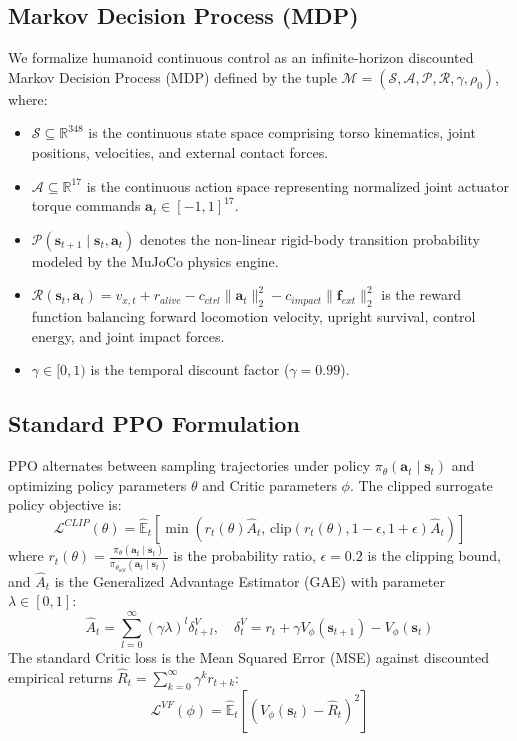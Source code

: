 \documentclass{article}
\begin{document}
\subsection{Markov Decision Process (MDP)}
We formalize humanoid continuous control as an infinite-horizon discounted Markov Decision Process (MDP) defined by the tuple $\mathcal{M} = (\mathcal{S}, \mathcal{A}, \mathcal{P}, \mathcal{R}, \gamma, \rho_0)$, where:
\begin{itemize}
    \item $\mathcal{S} \subseteq \mathbb{R}^{348}$ is the continuous state space comprising torso kinematics, joint positions, velocities, and external contact forces.
    \item $\mathcal{A} \subseteq \mathbb{R}^{17}$ is the continuous action space representing normalized joint actuator torque commands $\mathbf{a}_t \in [-1, 1]^{17}$.
    \item $\mathcal{P}(\mathbf{s}_{t+1} \mid \mathbf{s}_t, \mathbf{a}_t)$ denotes the non-linear rigid-body transition probability modeled by the MuJoCo physics engine.
    \item $\mathcal{R}(\mathbf{s}_t, \mathbf{a}_t) = v_{x, t} + r_{alive} - c_{ctrl} \|\mathbf{a}_t\|_2^2 - c_{impact} \|\mathbf{f}_{ext}\|_2^2$ is the reward function balancing forward locomotion velocity, upright survival, control energy, and joint impact forces.
    \item $\gamma \in [0, 1)$ is the temporal discount factor ($\gamma = 0.99$).
\end{itemize}

\subsection{Standard PPO Formulation}
PPO alternates between sampling trajectories under policy $\pi_\theta(\mathbf{a}_t \mid \mathbf{s}_t)$ and optimizing policy parameters $\theta$ and Critic parameters $\phi$. The clipped surrogate policy objective is:
\begin{equation}
\label{eq:ppo_clip}
\mathcal{L}^{CLIP}(\theta) = \hat{\mathbb{E}}_t \left[ \min\left( r_t(\theta) \hat{A}_t, \, \text{clip}(r_t(\theta), 1-\epsilon, 1+\epsilon) \hat{A}_t \right) \right]
\end{equation}
where $r_t(\theta) = \frac{\pi_\theta(\mathbf{a}_t \mid \mathbf{s}_t)}{\pi_{\theta_{old}}(\mathbf{a}_t \mid \mathbf{s}_t)}$ is the probability ratio, $\epsilon = 0.2$ is the clipping bound, and $\hat{A}_t$ is the Generalized Advantage Estimator (GAE) with parameter $\lambda \in [0, 1]$:
\begin{equation}
\label{eq:gae}
\hat{A}_t = \sum_{l=0}^\infty (\gamma \lambda)^l \delta_{t+l}^V, \quad \delta_t^V = r_t + \gamma V_\phi(\mathbf{s}_{t+1}) - V_\phi(\mathbf{s}_t)
\end{equation}
The standard Critic loss is the Mean Squared Error (MSE) against discounted empirical returns $\hat{R}_t = \sum_{k=0}^\infty \gamma^k r_{t+k}$:
\begin{equation}
\label{eq:critic_mse}
\mathcal{L}^{VF}(\phi) = \hat{\mathbb{E}}_t \left[ \left( V_\phi(\mathbf{s}_t) - \hat{R}_t \right)^2 \right]
\end{equation}
\end{document}
